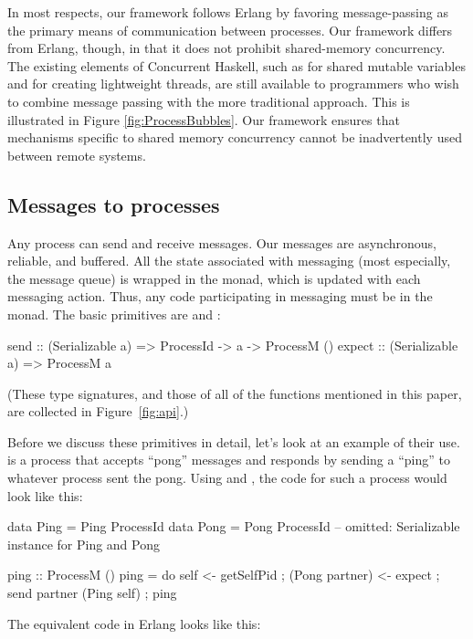 \documentclass[preprint]{sigplanconf}
\begin{document}
In most respects, our framework follows Erlang by favoring message-passing as the primary means of communication between processes. Our framework differs from Erlang, though, in that it does not prohibit shared-memory concurrency. The existing elements of Concurrent Haskell, such as  for shared mutable variables and  for creating lightweight threads, are still available to programmers who wish to combine message passing with the more traditional approach. This is illustrated in Figure \ref{fig:ProcessBubbles}. Our framework ensures that mechanisms specific to shared memory concurrency cannot be inadvertently used between remote systems. 

\subsection{Messages to processes}

Any process can send and receive messages. Our messages are asynchronous, reliable, and buffered.  All the state associated with messaging (most especially, the message queue) is wrapped in the  monad, which is updated with each messaging action. Thus, any code participating in messaging must be in the  monad.  The basic primitives are  and :

\begin{code}
send :: (Serializable a) => ProcessId -> a -> ProcessM ()
expect :: (Serializable a) => ProcessM a
\end{code}
(These type signatures, and those of all of the functions mentioned in this paper, are collected in Figure~\ref{fig:api}.)

Before we discuss these primitives in detail, let's look at an example of their use.
 is a process that accepts ``pong'' messages and responds by sending a ``ping'' to whatever process sent the pong. Using  and , the code for such a process would look like this:

\begin{code}[caption={Ping in Haskell}]
data Ping = Ping ProcessId
data Pong = Pong ProcessId
-- omitted: Serializable instance for Ping and Pong

ping :: ProcessM ()
ping = 
   do { self <- getSelfPid
      ; (Pong partner) <- expect
      ; send partner (Ping self)
      ; ping }
\end{code}

The equivalent code in Erlang looks like this:
\end{document}
